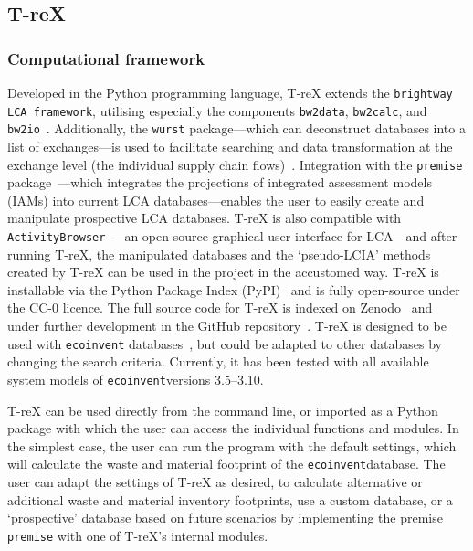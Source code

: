 \documentclass[a4paper,fleqn]{cas-dc}
\begin{document}
\subsection{T-reX}\label{sec:method-TreX}

\subsubsection{Computational framework}

Developed in the Python programming language, T-reX extends the \texttt{brightway LCA framework}, utilising especially the components
\texttt{bw2data}, \texttt{bw2calc}, and
\texttt{bw2io}~\citep{mutel2017brightway}. Additionally, the \texttt{wurst}
package---which can deconstruct databases into a list of exchanges---is used to
facilitate searching and data transformation at the exchange level (the
individual supply chain flows)~\citep{mutel2017wurst}. Integration with the
\texttt{premise} package~\citep{sacchi2022premise}---which integrates the
projections of integrated assessment models (IAMs) into current LCA
databases---enables the user to easily create and manipulate prospective LCA
databases. T-reX is also compatible with
\texttt{ActivityBrowser}~\citep{steubing2020activitybrowser}---an open-source
graphical user interface for LCA---and after running T-reX, the manipulated
databases and the `pseudo-LCIA' methods created by T-reX can be used in the
project in the accustomed way. T-reX is installable via the Python Package
Index (PyPI)~\citep{mcdowall2023T-reXpipy} and is fully open-source under the
CC-0 licence. The full source code for T-reX is indexed on
Zenodo~\citep{mcdowall2023T-reXzenodo} and under further development in the
GitHub repository~\citep{mcdowall2024T-reXgithub}. T-reX is designed to be used
with \texttt{ecoinvent} databases~\citep{ecoinvent2016version3}, but could be
adapted to other databases by changing the search criteria. Currently, it has
been tested with all available system models of \texttt{ecoinvent}versions
3.5--3.10.

T-reX can be used directly from the command line, or imported as a Python
package with which the user can access the individual functions and modules. In
the simplest case, the user can run the program with the default settings,
which will calculate the waste and material footprint of the
\texttt{ecoinvent}database. The user can adapt the settings of T-reX as
desired, to calculate alternative or additional waste and material inventory
footprints, use a custom database, or a `prospective' database based on future
scenarios by implementing the premise \texttt{premise} with one of T-reX's
internal modules.
\end{document}
